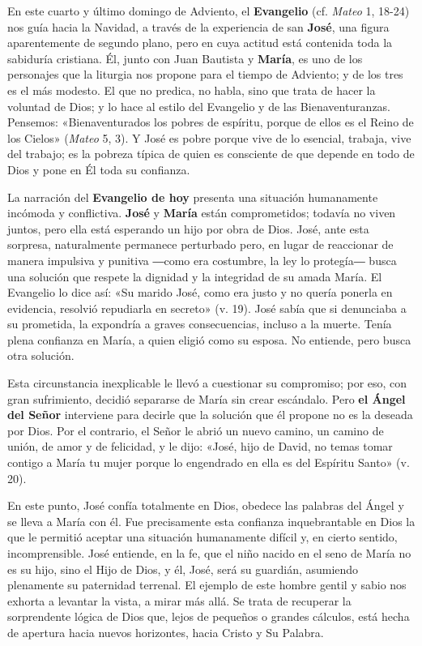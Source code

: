 \documentclass[]{article}
\begin{document}
En este cuarto y último domingo de Adviento, el \textbf{Evangelio} (cf.
\emph{Mateo} 1, 18-24) nos guía hacia la Navidad, a través de la
experiencia de san \textbf{José}, una figura aparentemente de segundo
plano, pero en cuya actitud está contenida toda la sabiduría cristiana.
Él, junto con Juan Bautista y \textbf{María}, es uno de los personajes
que la liturgia nos propone para el tiempo de Adviento; y de los tres es
el más modesto. El que no predica, no habla, sino que trata de hacer la
voluntad de Dios; y lo hace al estilo del Evangelio y de las
Bienaventuranzas. Pensemos: «Bienaventurados los pobres de espíritu,
porque de ellos es el Reino de los Cielos» (\emph{Mateo} 5, 3). Y José
es pobre porque vive de lo esencial, trabaja, vive del trabajo; es la
pobreza típica de quien es consciente de que depende en todo de Dios y
pone en Él toda su confianza.

La narración del \textbf{Evangelio de hoy} presenta una situación
humanamente incómoda y conflictiva. \textbf{José} y \textbf{María} están
comprometidos; todavía no viven juntos, pero ella está esperando un hijo
por obra de Dios. José, ante esta sorpresa, naturalmente permanece
perturbado pero, en lugar de reaccionar de manera impulsiva y punitiva
―como era costumbre, la ley lo protegía― busca una solución que respete
la dignidad y la integridad de su amada María. El Evangelio lo dice así:
«Su marido José, como era justo y no quería ponerla en evidencia,
resolvió repudiarla en secreto» (v. 19). José sabía que si denunciaba a
su prometida, la expondría a graves consecuencias, incluso a la muerte.
Tenía plena confianza en María, a quien eligió como su esposa. No
entiende, pero busca otra solución.

Esta circunstancia inexplicable le llevó a cuestionar su compromiso; por
eso, con gran sufrimiento, decidió separarse de María sin crear
escándalo. Pero \textbf{el Ángel del Señor} interviene para decirle que
la solución que él propone no es la deseada por Dios. Por el contrario,
el Señor le abrió un nuevo camino, un camino de unión, de amor y de
felicidad, y le dijo: «José, hijo de David, no temas tomar contigo a
María tu mujer porque lo engendrado en ella es del Espíritu Santo» (v.
20).

En este punto, José confía totalmente en Dios, obedece las palabras del
Ángel y se lleva a María con él. Fue precisamente esta confianza
inquebrantable en Dios la que le permitió aceptar una situación
humanamente difícil y, en cierto sentido, incomprensible. José entiende,
en la fe, que el niño nacido en el seno de María no es su hijo, sino el
Hijo de Dios, y él, José, será su guardián, asumiendo plenamente su
paternidad terrenal. El ejemplo de este hombre gentil y sabio nos
exhorta a levantar la vista, a mirar más allá. Se trata de recuperar la
sorprendente lógica de Dios que, lejos de pequeños o grandes cálculos,
está hecha de apertura hacia nuevos horizontes, hacia Cristo y Su
Palabra.
\end{document}
